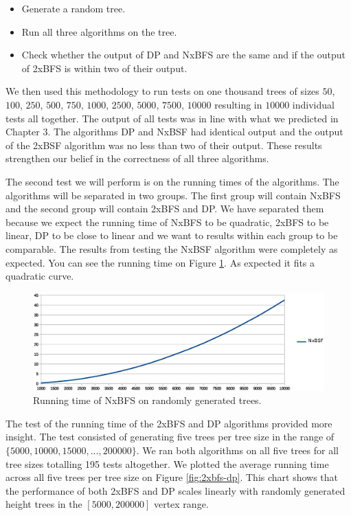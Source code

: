 \begin{itemize}
    \item Generate a random tree.
    \item Run all three algorithms on the tree.
    \item Check whether the output of DP and NxBFS are the same and if the output of 2xBFS is within two of their output.
\end{itemize}

We then used this methodology to run tests on one thousand trees of sizes $50$, $100$, $250$, $500$, $750$, $1000$, $2500$, $5000$, $7500$, $10000$ resulting in $10000$ individual tests all together. The output of all tests was in line with what we predicted in Chapter 3. The algorithms DP and NxBSF had identical output and the output of the 2xBSF algorithm was no less than two of their output. These results strengthen our belief in the correctness of all three algorithms.

The second test we will perform is on the running times of the algorithms. The algorithms will be separated in two groups. The first group will contain NxBFS and the second group will contain 2xBFS and DP. We have separated them because we expect the running time of NxBFS to be quadratic, 2xBFS to be linear, DP to be close to linear and we want to results within each group to be comparable. The results from testing the NxBSF algorithm were completely as expected. You can see the running time on Figure \ref{fig:nbfs}. As expected it fits a quadratic curve.

\begin{figure}[h]%
    \centering
    \includegraphics[center, scale=0.6 ]{./images/empirical/chart-nbfs.eps}
    \caption{Running time of NxBFS on randomly generated trees. }%
    \label{fig:nbfs}%
\end{figure}


The test of the running time of the 2xBFS and DP algorithms provided more insight. The test consisted of generating five trees per tree size in the range of $\{5000, 10000, 15000, ..., 200000\}$. We ran both algorithms on all five trees for all tree sizes totalling 195 tests altogether. We plotted the average running time across all five trees per tree size on Figure \ref{fig:2xbfs-dp}. This chart shows that the performance of both 2xBFS and DP scales linearly with randomly generated height trees in the $[5000, 200000]$ vertex range.

